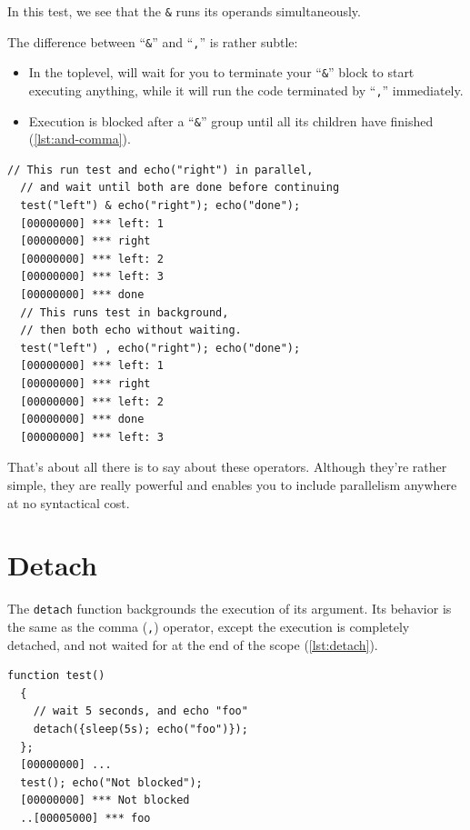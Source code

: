 \documentclass[openright,twoside,12pt]{report}
\newcommand{\lst}[1]{\autoref{lst:#1}}
\begin{document}
In this test, we see that the \texttt{\&} runs its operands
simultaneously.

The difference between ``\texttt{\&}'' and ``\texttt{,}'' is rather
subtle:

\begin{itemize}
\item In the toplevel, will wait for you to terminate your
  ``\texttt{\&}'' block to start executing anything, while it will run
  the code terminated by ``\texttt{,}'' immediately.
\item Execution is blocked after a ``\texttt{\&}'' group until all its
  children have finished (\lst{and-comma}).
\end{itemize}

\begin{lstlisting}[caption=Difference between ``\texttt{\&}'' and
  ``\texttt{,}'', label=lst:and-comma]
  // This run test and echo("right") in parallel,
  // and wait until both are done before continuing
  test("left") & echo("right"); echo("done");
  [00000000] *** left: 1
  [00000000] *** right
  [00000000] *** left: 2
  [00000000] *** left: 3
  [00000000] *** done
  // This runs test in background,
  // then both echo without waiting.
  test("left") , echo("right"); echo("done");
  [00000000] *** left: 1
  [00000000] *** right
  [00000000] *** left: 2
  [00000000] *** done
  [00000000] *** left: 3
\end{lstlisting}

That's about all there is to say about these operators. Although
they're rather simple, they are really powerful and enables you to
include parallelism anywhere at no syntactical cost.

\section{Detach}

The \texttt{detach} function backgrounds the execution of its
argument. Its behavior is the same as the comma (\texttt{,}) operator,
except the execution is completely detached, and not waited for at the
end of the scope (\lst{detach}).

\begin{lstlisting}[caption=Detach, label=lst:detach]
  function test()
  {
    // wait 5 seconds, and echo "foo"
    detach({sleep(5s); echo("foo")});
  };
  [00000000] ...
  test(); echo("Not blocked");
  [00000000] *** Not blocked
  ..[00005000] *** foo
\end{lstlisting}
\end{document}
